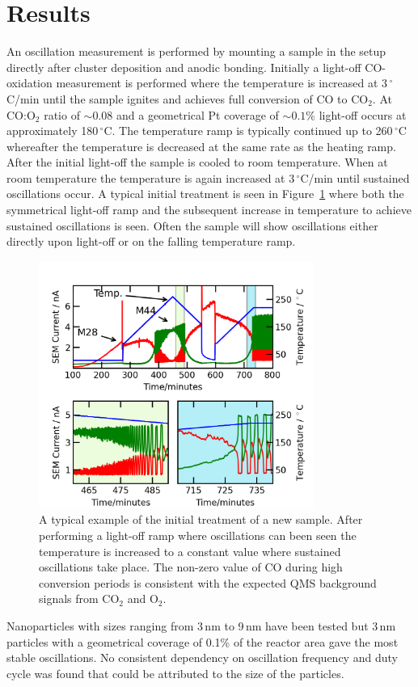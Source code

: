 \documentclass[8.5pt,twoside,twocolumn]{article}
\begin{document}
\section{Results}
An oscillation measurement is performed by mounting a sample in the setup directly after cluster deposition and anodic bonding. Initially a light-off CO-oxidation measurement is performed where the temperature is increased at 3\,$^\circ$C/min until the sample ignites and achieves full conversion of CO to CO$_2$. At CO:O$_2$ ratio of $\sim0.08$ and a geometrical Pt coverage of $\sim0.1\%$ light-off occurs at approximately 180\,$^\circ$C. The temperature ramp is typically continued up to 260\,$^\circ$C whereafter the temperature is decreased at the same rate as the heating ramp. After the initial light-off the sample is cooled to room temperature. When at room temperature the temperature is again increased at 3\,$^\circ$C/min until sustained oscillations occur. A typical initial treatment is seen in Figure~\ref{fgr:initial_treatment} where both the symmetrical light-off ramp and the subsequent increase in temperature to achieve sustained oscillations is seen. Often the sample will show oscillations either directly upon light-off or on the falling temperature ramp.
\begin{figure}[h]
\centering
  \includegraphics[width=9cm]{initial_treatment.png}
  \caption{A typical example of the initial treatment of a new sample. After performing a light-off ramp where oscillations can been seen the temperature is increased to a constant value where sustained oscillations take place. The non-zero value of CO during high conversion periods is consistent with the expected QMS background signals from CO$_2$ and O$_2$.}
  \label{fgr:initial_treatment}
\end{figure}
Nanoparticles with sizes ranging from 3\,nm to 9\,nm have been tested but 3\,nm particles with a geometrical coverage of 0.1\% of the reactor area gave the most stable oscillations. No consistent dependency on oscillation frequency and duty cycle was found that could be attributed to the size of the particles.
\end{document}
